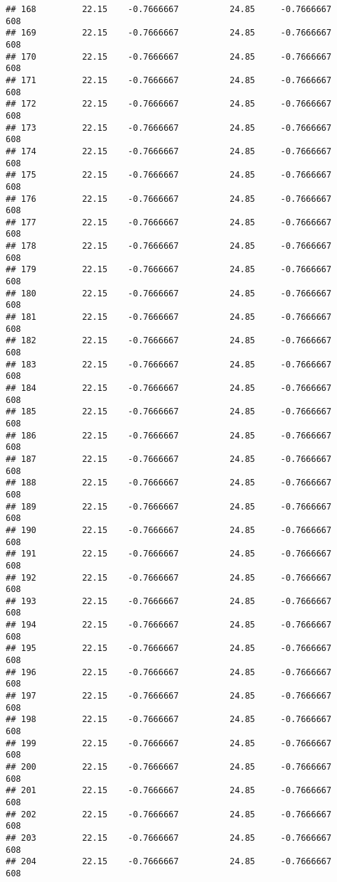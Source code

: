 \documentclass[]{article}
\begin{document}
\begin{verbatim}
## 168         22.15    -0.7666667          24.85     -0.7666667    608
## 169         22.15    -0.7666667          24.85     -0.7666667    608
## 170         22.15    -0.7666667          24.85     -0.7666667    608
## 171         22.15    -0.7666667          24.85     -0.7666667    608
## 172         22.15    -0.7666667          24.85     -0.7666667    608
## 173         22.15    -0.7666667          24.85     -0.7666667    608
## 174         22.15    -0.7666667          24.85     -0.7666667    608
## 175         22.15    -0.7666667          24.85     -0.7666667    608
## 176         22.15    -0.7666667          24.85     -0.7666667    608
## 177         22.15    -0.7666667          24.85     -0.7666667    608
## 178         22.15    -0.7666667          24.85     -0.7666667    608
## 179         22.15    -0.7666667          24.85     -0.7666667    608
## 180         22.15    -0.7666667          24.85     -0.7666667    608
## 181         22.15    -0.7666667          24.85     -0.7666667    608
## 182         22.15    -0.7666667          24.85     -0.7666667    608
## 183         22.15    -0.7666667          24.85     -0.7666667    608
## 184         22.15    -0.7666667          24.85     -0.7666667    608
## 185         22.15    -0.7666667          24.85     -0.7666667    608
## 186         22.15    -0.7666667          24.85     -0.7666667    608
## 187         22.15    -0.7666667          24.85     -0.7666667    608
## 188         22.15    -0.7666667          24.85     -0.7666667    608
## 189         22.15    -0.7666667          24.85     -0.7666667    608
## 190         22.15    -0.7666667          24.85     -0.7666667    608
## 191         22.15    -0.7666667          24.85     -0.7666667    608
## 192         22.15    -0.7666667          24.85     -0.7666667    608
## 193         22.15    -0.7666667          24.85     -0.7666667    608
## 194         22.15    -0.7666667          24.85     -0.7666667    608
## 195         22.15    -0.7666667          24.85     -0.7666667    608
## 196         22.15    -0.7666667          24.85     -0.7666667    608
## 197         22.15    -0.7666667          24.85     -0.7666667    608
## 198         22.15    -0.7666667          24.85     -0.7666667    608
## 199         22.15    -0.7666667          24.85     -0.7666667    608
## 200         22.15    -0.7666667          24.85     -0.7666667    608
## 201         22.15    -0.7666667          24.85     -0.7666667    608
## 202         22.15    -0.7666667          24.85     -0.7666667    608
## 203         22.15    -0.7666667          24.85     -0.7666667    608
## 204         22.15    -0.7666667          24.85     -0.7666667    608

\end{verbatim}
\end{document}
